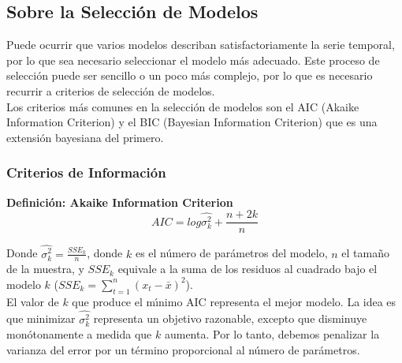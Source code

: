 
\subsection{Sobre la Selecci\'on de Modelos}

Puede ocurrir que varios modelos describan satisfactoriamente la serie temporal, por lo que sea necesario seleccionar el modelo m\'as adecuado. Este proceso de selecci\'on puede ser sencillo o un poco m\'as complejo, por lo que es necesario recurrir a criterios de selecci\'on de modelos.\\
Los criterios m\'as comunes en la selecci\'on de modelos son el AIC (Akaike Information Criterion) y el BIC (Bayesian Information Criterion) que es una extensi\'on bayesiana del primero. 


\subsubsection{Criterios de Informaci\'on}

\begin{mdframed}[style=MyFrame]
	\begin{definition}\label{def8}
		\textbf{Definici\'on: Akaike Information Criterion}
		\begin{equation*}
		AIC = log \hat{\sigma_k^2} + \frac{n+2k}{n} 
		\end{equation*}
	\end{definition}
\end{mdframed}
\vspace{4mm}	
Donde $\hat{\sigma_k^2} = \frac{SSE_k}{n}$, donde $k$ es el n\'umero de par\'ametros del modelo, $n$ el tama\~no de la muestra, y $SSE_k$ equivale a la suma de los residuos al cuadrado bajo el modelo $k$ ($SSE_k=\sum_{t=1}^{n}(x_t-\bar{x})^2$).\\
El valor de $k$ que produce el m\'{\i}nimo AIC representa el mejor modelo. La idea es que minimizar $\hat{\sigma_k^2}$ representa un objetivo razonable, excepto que disminuye mon\'otonamente a medida que $k$ aumenta. Por lo tanto, debemos penalizar la varianza del error por un t\'ermino proporcional al n\'umero de par\'ametros.

